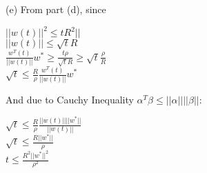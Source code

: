 \documentclass[12pt]{article}
\begin{document}
\indent (e) From part (d), since \begin{center} $||w(t)||^2 \leq tR^2||$ \\ $||w(t)|| \leq \sqrt{t}R$ \\ $\frac{w^T(t)}{||w(t)||}w^* \geq \frac{t\rho}{\sqrt{t}R} \geq\sqrt{t}\frac{\rho}{R}$\\ $\sqrt{t} \leq \frac{R}{\rho} \frac{w^T(t)}{||w(t)||}w^*$\end{center}And due to Cauchy Inequality $\alpha^T\beta \leq ||\alpha||||\beta||$: \begin{center}$\sqrt{t} \leq \frac{R}{\rho} \frac{||w(t)||||w^*||}{||w(t)||}$\\$\sqrt{t} \leq \frac{R||w^*||}{\rho}$\\$t \leq \frac{R^2||w^*||^2}{\rho^2}$\end{center}
\end{document}
